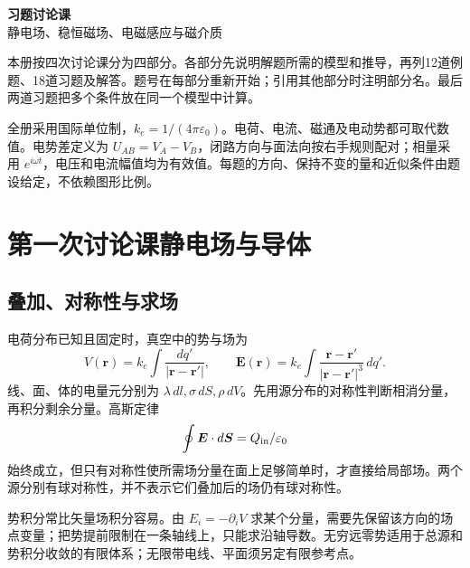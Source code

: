 \documentclass[UTF8,fontset=fandol,zihao=-4,a4paper]{ctexart}
\begin{document}
\begin{center}
{\LARGE\bfseries 习题讨论课}\\[5pt]
{\large 静电场、稳恒磁场、电磁感应与磁介质}
\end{center}
本册按四次讨论课分为四部分。各部分先说明解题所需的模型和推导，再列12道例题、18道习题及解答。题号在每部分重新开始；引用其他部分时注明部分名。最后两道习题把多个条件放在同一个模型中计算。

全册采用国际单位制，\(k_e=1/(4\pi\varepsilon_0)\)。电荷、电流、磁通及电动势都可取代数值。电势差定义为 \(U_{AB}=V_A-V_B\)，闭路方向与面法向按右手规则配对；相量采用 \(e^{i\omega t}\)，电压和电流幅值均为有效值。每题的方向、保持不变的量和近似条件由题设给定，不依赖图形比例。

\tableofcontents
\clearpage
\section{第一次讨论课\quad 静电场与导体}
\subsection{叠加、对称性与求场}
电荷分布已知且固定时，真空中的势与场为
\[
V(\boldsymbol r)=k_e\int\frac{dq'}{|\boldsymbol r-\boldsymbol r'|},\qquad
\boldsymbol E(\boldsymbol r)=k_e\int
\frac{\boldsymbol r-\boldsymbol r'}{|\boldsymbol r-\boldsymbol r'|^3}\,dq'.
\]
线、面、体的电量元分别为 \(\lambda\,dl,\sigma\,dS,\rho\,dV\)。先用源分布的对称性判断相消分量，再积分剩余分量。高斯定律
\[
\oint \boldsymbol E\cdot d\boldsymbol S=Q_{\rm in}/\varepsilon_0
\]
始终成立，但只有对称性使所需场分量在面上足够简单时，才直接给局部场。两个源分别有球对称性，并不表示它们叠加后的场仍有球对称性。

势积分常比矢量场积分容易。由 \(E_i=-\partial_iV\) 求某个分量，需要先保留该方向的场点变量；把势提前限制在一条轴线上，只能求沿轴导数。无穷远零势适用于总源和势积分收敛的有限体系；无限带电线、平面须另定有限参考点。
\end{document}

